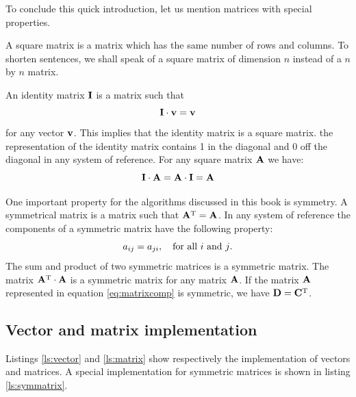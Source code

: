 \documentclass[twoside]{book}
\begin{document}
To conclude this quick introduction, let us mention matrices with
special properties.

A square matrix is a matrix which has the same number of rows and
columns. To shorten sentences, we shall speak of a square matrix
of dimension $n$ instead of a $n$ by $n$ matrix.

An identity matrix ${\bf I}$ is a matrix such that
\begin{equation}
  {\bf I}\cdot{\bf v}={\bf v}
\end{equation}
for any vector ${\bf v}$. This implies that the identity matrix is
a square matrix. the representation of the identity matrix
contains 1 in the diagonal and 0 off the diagonal in any system of
reference. For any square matrix ${\bf A}$ we have:
\begin{equation}
  {\bf I}\cdot{\bf A}={\bf A}\cdot{\bf I}={\bf A}
\end{equation}

One important property for the algorithms discussed in this book
is symmetry. A symmetrical matrix is a matrix such that ${\bf
A}^{\mathop{\rm T}}={\bf A}$. In any system of reference the
components of a symmetric matrix have the following property:
\begin{equation}
  a_{ij}=a_{ji}, \mbox{\quad for all $i$ and $j$.}
\end{equation}
The sum and product of two symmetric matrices is a symmetric
matrix. The matrix ${\bf A}^{\mathop{\rm T}}\cdot{\bf A}$ is a
symmetric matrix for any matrix ${\bf A}$. If the matrix ${\bf A}$
represented in equation \ref{eq:matrixcomp} is symmetric, we have
${\bf D}={\bf C}^{\mathop{\rm T}}$.

\subsection{Vector and matrix implementation}
\label{sec:slinearalgebra}  Listings \ref{ls:vector} and \ref{ls:matrix} show
respectively the implementation of vectors and matrices. 
A special implementation for symmetric matrices
is shown in listing \ref{ls:symmatrix}.
\end{document}
